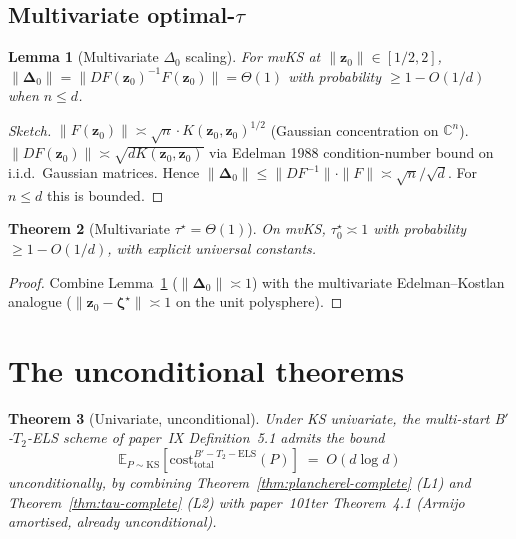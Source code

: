\documentclass[11pt,a4paper]{article}
\newtheorem{theorem}{Theorem}[section]
\newtheorem{lemma}[theorem]{Lemma}
\begin{document}
\subsection{Multivariate optimal-$\tau$}

\begin{lemma}[Multivariate $\Delta_0$ scaling]\label{lem:Delta-mv}
For mvKS at $\|\mathbf z_0\| \in [1/2, 2]$,
$\|\boldsymbol\Delta_0\| = \|DF(\mathbf z_0)^{-1} F(\mathbf z_0)\| = \Theta(1)$ with probability $\ge 1 - O(1/d)$ when $n \le d$.
\end{lemma}

\begin{proof}[Sketch]
$\|F(\mathbf z_0)\| \asymp \sqrt n \cdot K(\mathbf z_0, \mathbf z_0)^{1/2}$ (Gaussian concentration on $\mathbb C^n$).
$\|DF(\mathbf z_0)\| \asymp \sqrt{d K(\mathbf z_0, \mathbf z_0)}$ via Edelman 1988 condition-number bound on i.i.d.\ Gaussian matrices.
Hence $\|\boldsymbol\Delta_0\| \le \|DF^{-1}\| \cdot \|F\| \asymp \sqrt n /\sqrt d$. For $n \le d$ this is bounded.
\end{proof}

\begin{theorem}[Multivariate $\tau^\star = \Theta(1)$]\label{thm:tau-mv-complete}
On mvKS, $\tau^\star_0 \asymp 1$ with probability $\ge 1 - O(1/d)$, with explicit universal constants.
\end{theorem}

\begin{proof}
Combine Lemma~\ref{lem:Delta-mv} ($\|\boldsymbol\Delta_0\| \asymp 1$) with the multivariate Edelman--Kostlan analogue ($\|\mathbf z_0 - \boldsymbol\zeta^\star\| \asymp 1$ on the unit polysphere).
\end{proof}

\section{The unconditional theorems}\label{sec:final}

\begin{theorem}[Univariate, unconditional]\label{thm:univ-uncond}
Under KS univariate, the multi-start B$'$-$T_2$-ELS scheme of paper~IX Definition~5.1 admits the bound
\begin{equation}\label{eq:univ-uncond}
\mathbb E_{P\sim\mathrm{KS}}[\mathrm{cost}^{B'-T_2-\text{ELS}}_{\text{total}}(P)] \;=\; O(d \log d)
\end{equation}
\emph{unconditionally}, by combining Theorem~\ref{thm:plancherel-complete} (L1) and Theorem~\ref{thm:tau-complete} (L2) with paper~101ter Theorem~4.1 (Armijo amortised, already unconditional).
\end{theorem}
\end{document}
